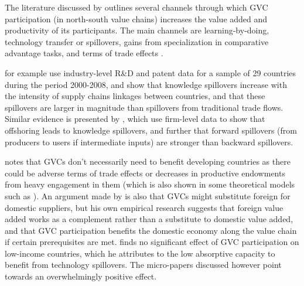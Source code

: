 \documentclass[a4paper]{article}
\begin{document}
The literature discussed by \citet{Kummritz20161} outlines several channels through which GVC participation (in north-south value chains) increases the value added and productivity of its participants. The main channels are learning-by-doing, technology transfer or spillovers, gains from specialization in comparative advantage tasks, and terms of trade effects  \citep{Kummritz20161}. \newline

\citet{piermartini2014knowledge} for example use industry-level R\&D and patent data for a sample of 29 countries during the period 2000-2008, and show that knowledge spillovers increase with the intensity of supply chains linkages between countries, and that these spillovers are larger in magnitude than spillovers from traditional trade flows. Similar evidence is presented by \citet{benz2015trade}, which use firm-level data to show that offshoring leads to knowledge spillovers, and further that forward spillovers (from producers to users if intermediate inputs) are stronger than backward spillovers. \newline

\citet{Kummritz20161} notes that GVCs don't necessarily need to benefit developing countries as there could be adverse terms of trade effects or decreases in productive endowments from heavy engagement in them (which is also shown in some theoretical models such as \citet{baldwin2014trade}). An argument made by \citet{kummritz2015global} is also that GVCs might substitute foreign for domestic suppliers, but his own empirical research suggests that 
foreign value added works as a complement rather than a substitute to domestic value added, and that GVC participation benefits the domestic economy along the value chain if certain prerequisites are met.  \citet{kummritz2015global} finds no significant effect of GVC participation on low-income countries, which he attributes to the low absorptive capacity to benefit from technology spillovers. The micro-papers discussed however point towards an overwhelmingly positive effect. \newline




\end{document}
